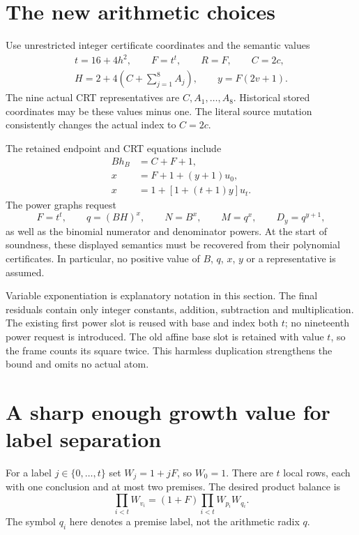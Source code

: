 \documentclass[11pt]{article}
\begin{document}
\section{The new arithmetic choices}\label{sec:choices}

Use unrestricted integer certificate coordinates and the semantic values
\begin{equation}\label{eq:choices}
\begin{gathered}
 t=16+4h^2,\qquad F=t^t,\qquad R=F,\qquad C=2c,\\
 H=2+4\left(C+\sum_{j=1}^{8}A_j\right),\qquad
 y=F(2v+1).
\end{gathered}
\end{equation}
The nine actual CRT representatives are $C,A_1,\ldots,A_8$.
Historical stored coordinates may be these values minus one. The literal
source mutation consistently changes the actual index to $C=2c$.

The retained endpoint and CRT equations include
\begin{align}
 Bh_B&=C+F+1,\label{eq:raw-index}\\
 x&=F+1+(y+1)u_0,\label{eq:first}\\
 x&=1+[1+(t+1)y]u_t.\label{eq:last}
\end{align}
The power graphs request
\[
 F=t^t,\qquad q=(BH)^x,\qquad N=B^x,\qquad
 M=q^x,\qquad D_y=q^{y+1},
\]
as well as the binomial numerator and denominator powers. At the start of
soundness, these displayed semantics must be recovered from their polynomial
certificates. In particular, no positive value of $B$, $q$, $x$, $y$ or a
representative is assumed.

Variable exponentiation is explanatory notation in this section. The final
residuals contain only integer constants, addition, subtraction and
multiplication. The existing first power slot is reused with base and
index both $t$; no nineteenth power request is introduced. The old affine
base slot is retained with value $t$, so the frame counts its square twice.
This harmless duplication strengthens the bound and omits no actual atom.

\section{A sharp enough growth value for label separation}\label{sec:labels}

For a label $j\in\{0,\ldots,t\}$ set $W_j=1+jF$, so $W_0=1$.
There are $t$ local rows, each with one conclusion and at most two premises.
The desired product balance is
\begin{equation}\label{eq:products}
 \prod_{i<t}W_{v_i}=(1+F)\prod_{i<t}W_{p_i}W_{q_i}.
\end{equation}
The symbol $q_i$ here denotes a premise label, not the arithmetic radix $q$.
\end{document}
